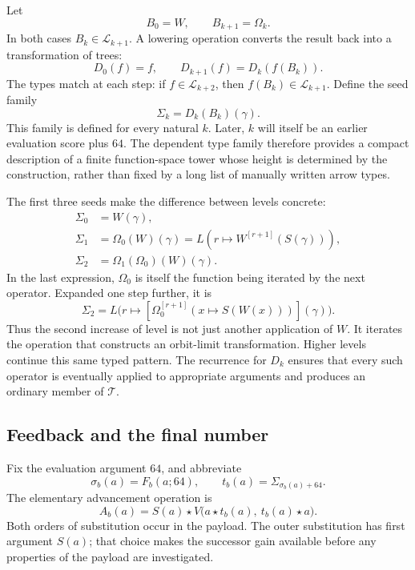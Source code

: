 Let
\[
 B_0=W,\qquad B_{k+1}=\Omega_k.
\]
In both cases $B_k\in\mathcal L_{k+1}$.  A lowering operation converts the
result back into a transformation of trees:
\[
 D_0(f)=f,\qquad
 D_{k+1}(f)=D_k(f(B_k)).
\]
The types match at each step: if $f\in\mathcal L_{k+2}$, then
$f(B_k)\in\mathcal L_{k+1}$.  Define the seed family
\[
 \Sigma_k=D_k(B_k)(\gamma).
\]
This family is defined for every natural $k$.  Later, $k$ will itself be an
earlier evaluation score plus $64$.  The dependent type family therefore
provides a compact description of a finite function-space tower whose
height is determined by the construction, rather than fixed by a long
list of manually written arrow types.

The first three seeds make the difference between levels concrete:
\begin{align*}
 \Sigma_0&=W(\gamma),\\
 \Sigma_1&=\Omega_0(W)(\gamma)
   =L(r\mapsto W^{[r+1]}(S(\gamma))),\\
 \Sigma_2&=\Omega_1(\Omega_0)(W)(\gamma).
\end{align*}
In the last expression, $\Omega_0$ is itself the function being iterated by
the next operator.  Expanded one step further, it is
\[
 \Sigma_2=L\bigl(r\mapsto
   [\Omega_0^{[r+1]}(x\mapsto S(W(x)))](\gamma)\bigr).
\]
Thus the second increase of level is not just another application of $W$.
It iterates the operation that constructs an orbit-limit transformation.
Higher levels continue this same typed pattern.  The recurrence for $D_k$
ensures that every such operator is eventually applied to appropriate
arguments and produces an ordinary member of $\mathcal T$.

\subsection{Feedback and the final number}
\label{amp:feedback}

Fix the evaluation argument $64$, and abbreviate
\[
 \sigma_b(a)=F_b(a;64),\qquad
 t_b(a)=\Sigma_{\sigma_b(a)+64}.
\]
The elementary advancement operation is
\begin{equation}
 A_b(a)=S(a)\star
 V\bigl(a\star t_b(a),\ t_b(a)\star a\bigr).
 \label{amp:eq:advance}
\end{equation}
Both orders of substitution occur in the payload.  The outer substitution
has first argument $S(a)$; that choice makes the successor gain available
before any properties of the payload are investigated.

